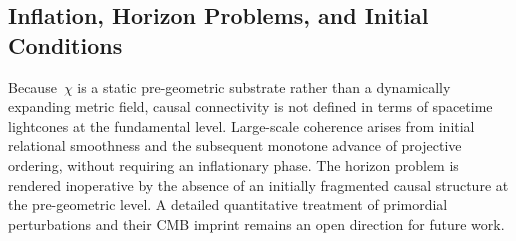 \subsection{Inflation, Horizon Problems, and Initial Conditions}
  \label{subsec:inflation-horizon-problems-and-initial-conditions}

  Because~$\chi$ is a static pre-geometric substrate rather than a
  dynamically expanding metric field, causal connectivity is not defined
  in terms of spacetime lightcones at the fundamental level.
  Large-scale coherence arises from initial relational smoothness and
  the subsequent monotone advance of projective ordering, without
  requiring an inflationary phase.
  The horizon problem is rendered inoperative by the absence of an
  initially fragmented causal structure at the pre-geometric level.
  A detailed quantitative treatment of primordial perturbations and their
  CMB imprint remains an open direction for future work.
